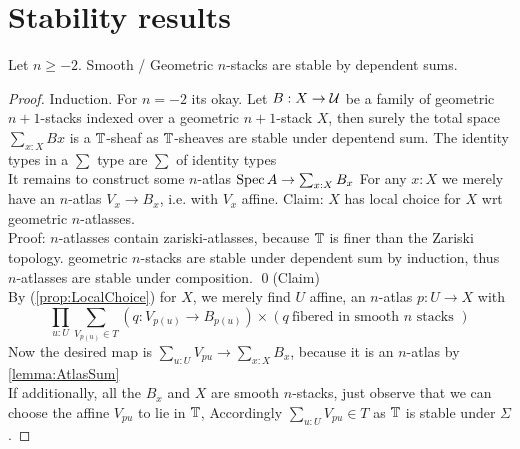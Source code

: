 \documentclass{article}
\begin{document}
\section{Stability results}
\begin{theorem}{\label{thm:stabSums}}
    Let $n \ge -2$. Smooth / Geometric $n$-stacks are stable by dependent sums.
\end{theorem}
\begin{proof}
    Induction.
    For $n = -2$ its okay.    
    Let $B : X \to \mathcal{U}$ be a family of geometric $n+1$-stacks indexed over a geometric $n+1$-stack $X$, then surely the total space $\sum_{x : X} B x$ is a $\mathbb{T}$-sheaf as $\mathbb{T}$-sheaves are stable under depentend sum. 
    The identity types in a $\sum$ type are $\sum$ of identity types 
    \\ %
    It remains to construct some $n$-atlas $\operatorname{Spec} A \to \sum_{x : X} B_x$ %
    For any $x : X$ we merely have an $n$-atlas $V_x \to B_x$, i.e. with $V_x$ affine. %
    Claim: $X$ has local choice for $X$ wrt geometric $n$-atlasses.\\
    Proof:
        $n$-atlasses contain zariski-atlasses, because $\mathbb{T}$ is finer than the Zariski topology.
        geometric $n$-stacks are stable under dependent sum by induction, thus $n$-atlasses are stable under composition.         
    \qed(Claim)\\
    By (\ref{prop:LocalChoice}) for $X$, we merely find $U$ affine, an $n$-atlas $p : U \to X$ %
    with
    \[
    \prod_{u : U} \sum_{V_{p(u)} \in T} (q : V_{p(u)} \to B_{p(u)}) \times (q \ \text{fibered in smooth } n \text{ stacks } )
    \]
    Now the desired map is $\sum_{u : U} V_{p u} \to \sum_{x : X} B_x$, because it is  an $n$-atlas %
    by \ref{lemma:AtlasSum} \\
    If additionally, all the $B_x$ and $X$ are smooth $n$-stacks, just observe that we can choose the affine $V_{p u}$ to lie in $\mathbb{T}$, Accordingly $\sum_{u : U} V_{p u} \in T$ as $\mathbb{T}$ is stable under $\Sigma$.
    
\end{proof}
\end{document}
